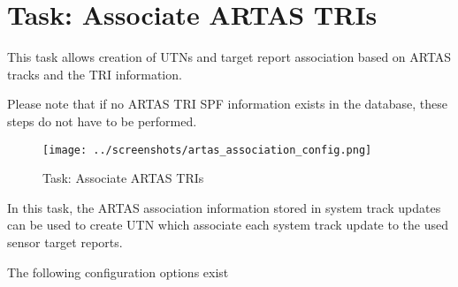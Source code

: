 \section{Task: Associate ARTAS TRIs}
\label{sec:task_associate_artas_tris}

This task allows creation of UTNs and target report association based on ARTAS tracks and the TRI information.

Please note that if no ARTAS TRI SPF information exists in the database, these steps do not have to be performed.\\

\begin{figure}[H]
  \hspace*{-2.5cm}
    \texttt{[image: ../screenshots/artas\_association\_config.png]}
  \caption{Task: Associate ARTAS TRIs}
\end{figure}

In this task, the ARTAS association information stored in system track updates can be used to create UTN which associate each system track update to the used sensor target reports.

The following configuration options exist

